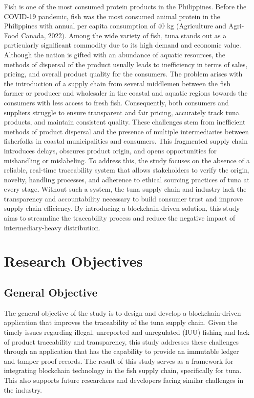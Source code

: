 Fish is one of the most consumed protein products in the Philippines. Before the COVID-19 pandemic, fish was the most consumed animal protein in the Philippines with annual per capita consumption of 40 kg (Agriculture and Agri-Food Canada, 2022). Among the wide variety of fish, tuna stands out as a particularly significant commodity due to its high demand and economic value. Although the nation is gifted with an abundance of aquatic resources, the methods of dispersal of the product usually leads to inefficiency in terms of sales, pricing, and overall product quality for the consumers. The problem arises with the introduction of a supply chain from several middlemen between the fish farmer or producer and wholesaler in the coastal and aquatic regions towards the consumers with less access to fresh fish. Consequently, both consumers and suppliers struggle to ensure transparent and fair pricing, accurately track tuna products, and maintain consistent quality. These challenges stem from inefficient methods of product dispersal and the presence of multiple intermediaries between fisherfolks in coastal municipalities and consumers. This fragmented supply chain introduces delays, obscures product origin, and opens opportunities for mishandling or mislabeling. To address this, the study focuses on the absence of a reliable, real-time traceability system that allows stakeholders to verify the origin, novelty, handling processes, and adherence to ethical sourcing practices of tuna at every stage. Without such a system, the tuna supply chain and industry lack the transparency and accountability necessary to build consumer trust and improve supply chain efficiency. By introducing a blockchain-driven solution, this study aims to streamline the traceability process and reduce the negative impact of intermediary-heavy distribution.



\section{Research Objectives}
\label{sec:researchobjectives}

\subsection{General Objective}
\label{sec:generalobjective}

The general objective of the study is to design and develop a blockchain-driven application that improves the traceability of the tuna supply chain. Given the timely issues regarding illegal, unreported and unregulated (IUU) fishing and lack of product traceability and transparency, this study addresses these challenges through an application that has the capability to provide an immutable ledger and tamper-proof records. The result of this study serves as a framework for integrating blockchain technology in the fish supply chain, specifically for tuna. This also supports future researchers and developers facing similar challenges in the industry.


